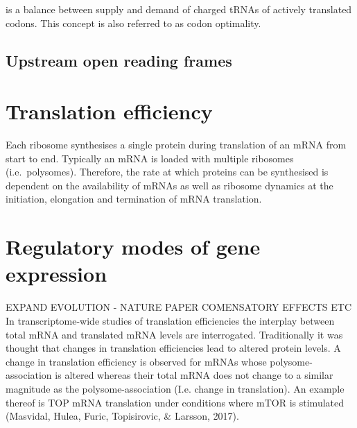 \documentclass[
  12pt,
  openany]{book}
\begin{document}
is a balance between supply and demand of charged tRNAs of actively translated codons. This concept is also referred to as codon optimality.

\subsection{Upstream open reading frames}

\section{Translation efficiency}

Each ribosome synthesises a single protein during translation of an mRNA from start to end. Typically an mRNA is loaded with multiple ribosomes (i.e.~polysomes). Therefore, the rate at which proteins can be synthesised is dependent on the availability of mRNAs as well as ribosome dynamics at the initiation, elongation and termination of mRNA translation.

\section{Regulatory modes of gene expression}

EXPAND EVOLUTION - NATURE PAPER COMENSATORY EFFECTS ETC
In transcriptome-wide studies of translation efficiencies the interplay between total mRNA and translated mRNA levels are interrogated. Traditionally it was thought that changes in translation efficiencies lead to altered protein levels. A change in translation efficiency is observed for mRNAs whose polysome-association is altered whereas their total mRNA does not change to a similar magnitude as the polysome-association (I.e. change in translation). An example thereof is TOP mRNA translation under conditions where mTOR is stimulated (Masvidal, Hulea, Furic, Topisirovic, \& Larsson, 2017).
\end{document}
